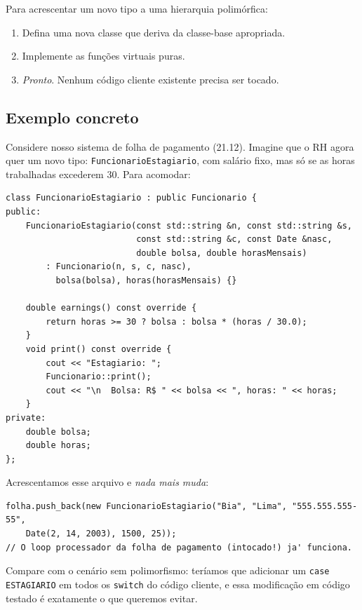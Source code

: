 \documentclass[11pt,a4paper]{article}
\begin{document}
Para acrescentar um novo tipo a uma hierarquia polim\'orfica:

\begin{enumerate}[leftmargin=*,itemsep=0pt]
  \item Defina uma nova classe que deriva da classe-base apropriada.
  \item Implemente as fun\c{c}\~oes virtuais puras.
  \item \emph{Pronto}. Nenhum c\'odigo cliente existente precisa ser tocado.
\end{enumerate}

\subsection*{Exemplo concreto}

Considere nosso sistema de folha de pagamento (21.12). Imagine que o RH agora quer um novo tipo: \texttt{FuncionarioEstagiario}, com sal\'ario fixo, mas s\'o se as horas trabalhadas excederem 30. Para acomodar:

\begin{lstlisting}[style=cppcode,numbers=none]
class FuncionarioEstagiario : public Funcionario {
public:
    FuncionarioEstagiario(const std::string &n, const std::string &s,
                          const std::string &c, const Date &nasc,
                          double bolsa, double horasMensais)
        : Funcionario(n, s, c, nasc),
          bolsa(bolsa), horas(horasMensais) {}

    double earnings() const override {
        return horas >= 30 ? bolsa : bolsa * (horas / 30.0);
    }
    void print() const override {
        cout << "Estagiario: ";
        Funcionario::print();
        cout << "\n  Bolsa: R$ " << bolsa << ", horas: " << horas;
    }
private:
    double bolsa;
    double horas;
};
\end{lstlisting}

Acrescentamos esse arquivo e \emph{nada mais muda}:

\begin{lstlisting}[style=cppcode,numbers=none]
folha.push_back(new FuncionarioEstagiario("Bia", "Lima", "555.555.555-55",
    Date(2, 14, 2003), 1500, 25));
// O loop processador da folha de pagamento (intocado!) ja' funciona.
\end{lstlisting}

Compare com o cen\'ario sem polimorfismo: ter\'iamos que adicionar um \texttt{case ESTAGIARIO} em todos os \texttt{switch} do c\'odigo cliente, e essa modifica\c{c}\~ao em c\'odigo testado \'e exatamente o que queremos evitar.
\end{document}
